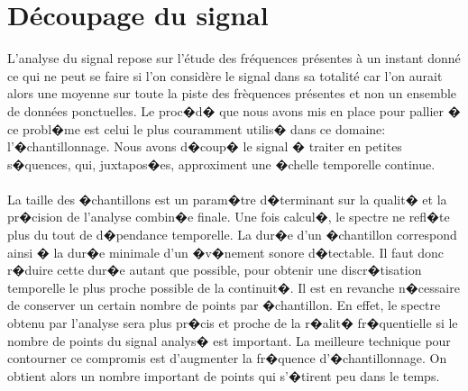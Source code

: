         
	\section{Découpage du signal}
        	L'analyse du signal repose sur l'étude des fréquences présentes à un instant donné ce qui ne peut se faire
        	si l'on considère le signal dans sa totalité car l'on aurait alors une moyenne sur toute la piste des frèquences présentes
        	et non un ensemble de données ponctuelles. Le proc�d� 
		que nous avons mis en place pour pallier � ce probl�me est celui le plus couramment utilis� dans ce domaine: 
		l'�chantillonnage. Nous avons d�coup� le signal � traiter en petites s�quences, qui, juxtapos�es, approximent une �chelle temporelle continue.
\paragraph{}
La taille des �chantillons est un param�tre d�terminant sur la qualit� et la pr�cision de l'analyse combin�e finale. 
	Une fois calcul�, le spectre ne refl�te plus du tout de d�pendance temporelle. La dur�e d'un �chantillon correspond 
	ainsi � la dur�e minimale d'un �v�nement sonore d�tectable. Il faut donc r�duire cette dur�e autant que possible, 
	pour obtenir une discr�tisation temporelle le plus proche possible de la continuit�. Il est en revanche n�cessaire 
	de conserver un certain nombre de points par �chantillon. En effet, le spectre obtenu par l'analyse sera plus pr�cis 
	et proche de la r�alit� fr�quentielle si le nombre de points du signal analys� est important. La meilleure technique 
	pour contourner ce compromis est d'augmenter la fr�quence d'�chantillonnage. 
	On obtient alors un nombre important de points qui s'�tirent peu dans le temps.
